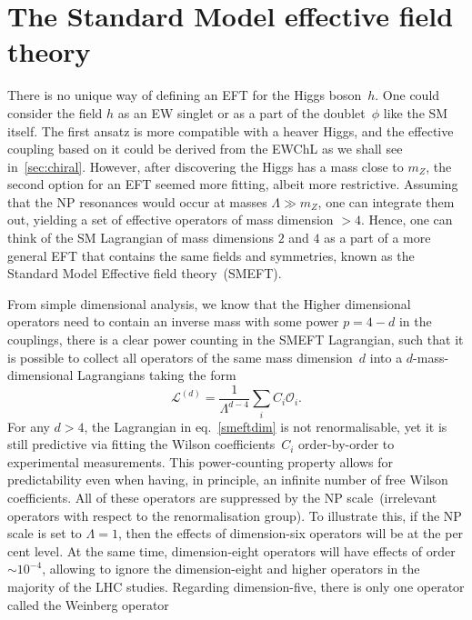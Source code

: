 \section{The Standard Model effective field theory \label{sec:smeft}}
\par There is no unique way of defining an EFT for the Higgs boson~$h$. One could consider the field $h$ as an EW singlet or as a part of the doublet~$\phi$ like the SM itself. The first ansatz is more compatible with a heaver Higgs, and the effective coupling based on it could be derived from the EWChL as we shall see in~\autoref{sec:chiral}. However, after discovering the Higgs has a mass close to $m_Z$, the second option for an EFT seemed more fitting, albeit more restrictive. Assuming that the NP resonances would occur at masses $\Lambda \gg m_Z$, one can integrate them out, yielding a set of effective operators of mass dimension $> 4$.  Hence, one can think of the SM Lagrangian of mass dimensions $2$ and $4$ as a part of a more general EFT that contains the same fields and symmetries, known as the Standard Model Effective field theory~(SMEFT). 
\par From simple dimensional analysis, we know that the Higher dimensional operators need to contain an inverse mass with some power $p=4-d$ in the couplings, there is a clear power counting in the SMEFT Lagrangian, such that it is possible to collect all operators of the same mass dimension~$d$ into a $d$-mass-dimensional Lagrangians taking the form
\begin{equation}
	\mathcal{L}^{(d)} = \frac{1}{\Lambda^{d-4}} \sum_i  C_i \mathcal{O}_i .
	\label{smeftdim}
\end{equation}
For any $d >4$, the Lagrangian in eq.~\eqref{smeftdim} is not renormalisable, yet it is still predictive via fitting the Wilson coefficients~$C_i$ order-by-order to experimental measurements. This power-counting property allows for predictability even when having, in principle, an infinite number of free Wilson coefficients. All of these operators are suppressed by the NP scale~(irrelevant operators with respect to the renormalisation group). To illustrate this,  if the NP scale is set to  $\Lambda =1$, then the effects of dimension-six operators will be at the per cent level. At the same time, dimension-eight operators will have effects of order~$\sim10^{-4}$, allowing to ignore the dimension-eight and higher operators in the majority of the LHC studies.  Regarding dimension-five, there is only one operator called the Weinberg operator~\cite{PhysRevLett.43.1566}
